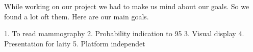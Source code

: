 While working on our project we had to make us mind about our goals. So we found a lot oft them.  Here are our main goals.

1.	To read mammography
2.	Probability indication to 95%
3.	Visual display
4.	Presentation for laity
5.	Platform independet
